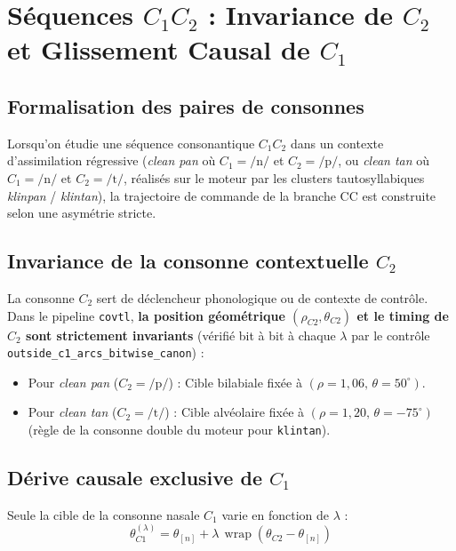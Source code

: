 \documentclass[11pt,a4paper]{article}
\begin{document}
\section{Séquences $C_1 C_2$ : Invariance de $C_2$ et Glissement Causal de $C_1$}

\subsection{Formalisation des paires de consonnes}
Lorsqu'on étudie une séquence consonantique $C_1 C_2$ dans un contexte d'assimilation régressive (\textit{clean pan} où $C_1 = \text{/n/}$ et $C_2 = \text{/p/}$, ou \textit{clean tan} où $C_1 = \text{/n/}$ et $C_2 = \text{/t/}$, réalisés sur le moteur par les clusters tautosyllabiques \textit{klinpan} / \textit{klintan}), la trajectoire de commande de la branche CC est construite selon une asymétrie stricte.

\subsection{Invariance de la consonne contextuelle $C_2$}
La consonne $C_2$ sert de déclencheur phonologique ou de contexte de contrôle. Dans le pipeline \texttt{covtl}, \textbf{la position géométrique $(\rho_{C2}, \theta_{C2})$ et le timing de $C_2$ sont strictement invariants} (vérifié bit à bit à chaque $\lambda$ par le contrôle \texttt{outside\_c1\_arcs\_bitwise\_canon}) :
\begin{itemize}[leftmargin=*]
    \item Pour \textit{clean pan} ($C_2 = \text{/p/}$) : Cible bilabiale fixée à $(\rho = 1{,}06,\, \theta = 50^\circ)$.
    \item Pour \textit{clean tan} ($C_2 = \text{/t/}$) : Cible alvéolaire fixée à $(\rho = 1{,}20,\, \theta = -75^\circ)$ (règle de la consonne double du moteur pour \texttt{klintan}).
\end{itemize}

\subsection{Dérive causale exclusive de $C_1$}
Seule la cible de la consonne nasale $C_1$ varie en fonction de $\lambda$ :
\begin{equation}
\theta_{C1}^{(\lambda)} = \theta_{[n]} + \lambda \,\operatorname{wrap}\!\left(\theta_{C2} - \theta_{[n]}\right)
\end{equation}
\end{document}
